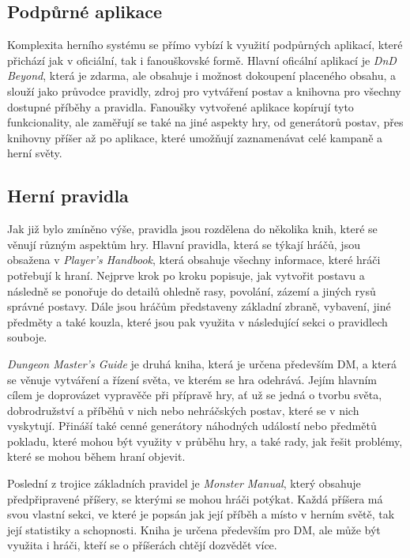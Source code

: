 \subsection{Podpůrné aplikace}
\label{subsec:dnd_apps}

Komplexita herního systému \dnd{} se přímo vybízí k využití podpůrných aplikací, které přichází jak v oficiální, tak i fanouškovské formě. Hlavní oficální aplikací je \textit{DnD Beyond}, která je zdarma, ale obsahuje i možnost dokoupení placeného obsahu, a slouží jako průvodce pravidly, zdroj pro vytváření postav a knihovna pro všechny dostupné příběhy a pravidla. Fanoušky vytvořené aplikace kopírují tyto funkcionality, ale zaměřují se také na jiné aspekty hry, od generátorů postav, přes knihovny příšer až po aplikace, které umožňují zaznamenávat celé kampaně a herní světy.

\subsection{Herní pravidla}
\label{subsec:dnd_rules}

Jak již bylo zmíněno výše, pravidla \dnd{} jsou rozdělena do několika knih, které se věnují různým aspektům hry. Hlavní pravidla, která se týkají hráčů, jsou obsažena v \textit{Player's Handbook}, která obsahuje všechny informace, které hráči potřebují k hraní. Nejprve krok po kroku popisuje, jak vytvořit postavu a následně se ponořuje do detailů ohledně rasy, povolání, zázemí a jiných rysů správné postavy. Dále jsou hráčům představeny základní zbraně, vybavení, jiné předměty a také kouzla, které jsou pak využita v následující sekci o pravidlech souboje.

\textit{Dungeon Master's Guide} je druhá kniha, která je určena především DM, a která se věnuje vytváření a řízení světa, ve kterém se hra odehrává. Jejím hlavním cílem je doprovázet vypravěče při přípravě hry, ať už se jedná o tvorbu světa, dobrodružství a příběhů v nich nebo nehráčských postav, které se v nich vyskytují. Přináší také cenné generátory náhodných událostí nebo předmětů pokladu, které mohou být využity v průběhu hry, a také rady, jak řešit problémy, které se mohou během hraní objevit.

Poslední z trojice základních pravidel je \textit{Monster Manual}, který obsahuje předpřipravené příšery, se kterými se mohou hráči potýkat. Každá příšera má svou vlastní sekci, ve které je popsán jak její příběh a místo v herním světě, tak její statistiky a schopnosti. Kniha je určena především pro DM, ale může být využita i hráči, kteří se o příšerách chtějí dozvědět více.

